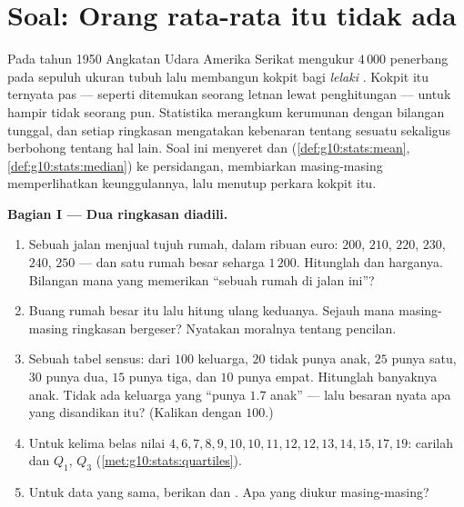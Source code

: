 \section{Soal: Orang rata-rata itu tidak ada}

\begin{problem}
\label{pb:g10:stats:1}
Pada tahun 1950 Angkatan Udara Amerika Serikat mengukur $4\,000$ penerbang
pada sepuluh ukuran tubuh lalu membangun kokpit bagi \emph{lelaki }.
Kokpit itu ternyata pas --- seperti ditemukan seorang letnan lewat
penghitungan --- untuk hampir tidak seorang pun. Statistika merangkum
kerumunan dengan bilangan tunggal, dan setiap ringkasan mengatakan kebenaran
tentang sesuatu sekaligus berbohong tentang hal lain. Soal ini menyeret
 dan  (\cref{def:g10:stats:mean}, \cref{def:g10:stats:median})
ke persidangan, membiarkan masing-masing memperlihatkan keunggulannya, lalu
menutup perkara kokpit itu.

\medskip
\noindent\textbf{Bagian I --- Dua ringkasan diadili.}
\begin{enumerate}
  \item Sebuah jalan menjual tujuh rumah, dalam ribuan euro:
        $200$, $210$, $220$, $230$, $240$, $250$ --- dan satu
        rumah besar seharga $1\,200$. Hitunglah  dan 
        harganya. Bilangan mana yang memerikan ``sebuah rumah di jalan ini''?
  \item Buang rumah besar itu lalu hitung ulang keduanya. Sejauh mana
        masing-masing ringkasan bergeser? Nyatakan moralnya tentang pencilan.
  \item Sebuah tabel sensus: dari $100$ keluarga, $20$ tidak
        punya anak, $25$ punya satu, $30$ punya dua, $15$ punya
        tiga, dan $10$ punya empat. Hitunglah  banyaknya anak. Tidak ada
        keluarga yang ``punya $1.7$ anak'' --- lalu besaran nyata apa
        yang disandikan  itu? (Kalikan dengan $100$.)
  \item Untuk kelima belas nilai
        $4, 6, 7, 8, 9, 10, 10, 11, 12, 12, 13, 14, 15, 17, 19$:
        carilah  dan  $Q_1$, $Q_3$
        (\cref{met:g10:stats:quartiles}).
  \item Untuk data yang sama, berikan  dan
        . Apa yang diukur masing-masing?
\end{enumerate}


\end{problem}
